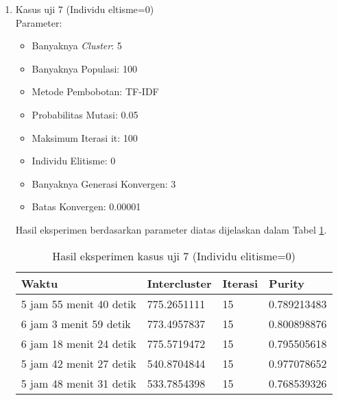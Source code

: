 \begin{enumerate}
	\item Kasus uji 7 (Individu eltisme=0)\\
	Parameter:
	\begin{itemize}
		\item Banyaknya \textit{Cluster}: 5
		\item Banyaknya Populasi: 100
		\item Metode Pembobotan: TF-IDF
		\item Probabilitas Mutasi: 0.05
		\item Maksimum Iterasi it: 100
		\item Individu Elitisme: 0
		\item Banyaknya Generasi Konvergen: 3
		\item Batas Konvergen: 0.00001
	\end{itemize}
	Hasil eksperimen berdasarkan parameter diatas dijelaskan dalam Tabel \ref{tbl:res7}.
	\begin{table}[H]
		\centering
		\begin{tabular}{|l|l|l|l|} \hline
			Waktu & Intercluster & Iterasi & Purity \\ \hline
			5 jam 55 menit 40 detik & 775.2651111 & 15 & 0.789213483 \\ \hline
			6 jam 3 menit 59 detik  & 773.4957837 & 15 & 0.800898876 \\ \hline
			6 jam 18 menit 24 detik & 775.5719472 & 15 & 0.795505618 \\ \hline
			5 jam 42 menit 27 detik & 540.8704844 & 15 & 0.977078652 \\ \hline
			5 jam 48 menit 31 detik & 533.7854398 & 15 & 0.768539326 \\ \hline
		\end{tabular}
		\caption{Hasil eksperimen kasus uji 7 (Individu elitisme=0)}
		\label{tbl:res7}
	\end{table}


\end{enumerate}
